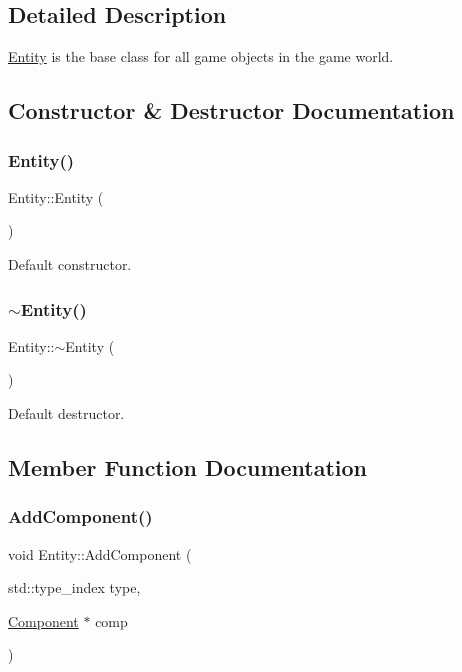 \subsection{Detailed Description}
\mbox{\hyperlink{class_entity}{Entity}} is the base class for all game objects in the game world. 

\subsection{Constructor \& Destructor Documentation}
\mbox{\label{class_entity_a980f368aa07ce358583982821533a54a}} 
\subsubsection{\texorpdfstring{Entity()}{Entity()}}
{\footnotesize\ttfamily Entity\+::\+Entity (\begin{DoxyParamCaption}{ }\end{DoxyParamCaption})}

Default constructor. \mbox{\label{class_entity_adf6d3f7cb1b2ba029b6b048a395cc8ae}} 
\subsubsection{\texorpdfstring{$\sim$\+Entity()}{~Entity()}}
{\footnotesize\ttfamily Entity\+::$\sim$\+Entity (\begin{DoxyParamCaption}{ }\end{DoxyParamCaption})\hspace{0.3cm}{\ttfamily [virtual]}}

Default destructor. 

\subsection{Member Function Documentation}
\mbox{\label{class_entity_ae4af7f884155869ae624c5668d67d4e5}} 
\subsubsection{\texorpdfstring{Add\+Component()}{AddComponent()}}
{\footnotesize\ttfamily void Entity\+::\+Add\+Component (\begin{DoxyParamCaption}\item[{std\+::type\+\_\+index}]{type,  }\item[{\mbox{\hyperlink{class_component}{Component}} $\ast$}]{comp }\end{DoxyParamCaption})}

